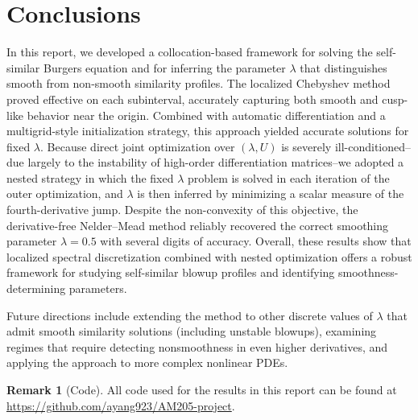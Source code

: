 \documentclass[12pt]{article}
\theoremstyle{definition}\newtheorem{lemma}{Lemma}
\newtheorem{remark}{Remark}
\begin{document}
\section{Conclusions}\label{sec:conclusions}
In this report, we developed a collocation-based framework for solving the
self-similar Burgers equation and for inferring the parameter $\lambda$ that
distinguishes smooth from non-smooth similarity profiles. The localized
Chebyshev method proved effective on each subinterval, accurately capturing both
smooth and cusp-like behavior near the origin. Combined with automatic
differentiation and a multigrid-style initialization strategy, this approach
yielded accurate solutions for fixed $\lambda$. Because direct joint optimization over $(\lambda, U)$ is severely
ill-conditioned--due largely to the instability of high-order differentiation
matrices--we adopted a nested strategy in which the fixed $\lambda$ problem is solved in each iteration of the outer optimization,
and $\lambda$ is then inferred by minimizing a scalar measure of the
fourth-derivative jump. Despite the non-convexity of this objective, the
derivative-free Nelder--Mead method reliably recovered the correct smoothing
parameter $\lambda = 0.5$ with several digits of accuracy. Overall, these results show that localized spectral discretization combined with
nested optimization offers a robust framework for studying self-similar blowup
profiles and identifying smoothness-determining parameters. 

Future directions
include extending the method to other discrete values of $\lambda$ that admit
smooth similarity solutions (including unstable blowups), examining regimes that
require detecting nonsmoothness in even higher derivatives, and applying the
approach to more complex nonlinear PDEs.

\begin{remark}[Code]
    All code used for the results in this report can be found at\\
    \url{https://github.com/ayang923/AM205-project}.
\end{remark}



\end{document}
